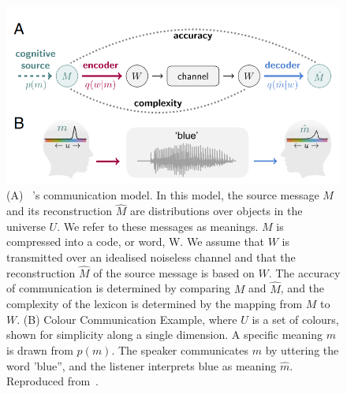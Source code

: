 \begin{figure}[hbt!]
 \centering
 \includegraphics[width=1\textwidth]{image/lit/datacompress1.PNG}
 \caption[(A) Shannon's communication model. In this model, the source
 message $M$ and its reconstruction $\hat{M}$ are distributions over objects
 in the universe $U$. We refer to these messages as meanings. $M$ is compressed
 into a code, or word, W. We assume that $W$ is transmitted over an
 idealised noiseless channel and that the reconstruction $\hat{M}$
 of the source message is based on $W$.
 The accuracy of communication is determined by comparing $M$ and $\hat{M}$,
 and the complexity of the lexicon is determined by the mapping from $M$ to
 $W$. (B) Colour Communication Example, where $U$ is a set of colours, shown
 for simplicity along a single dimension. A specific meaning $m$ is drawn from
 $p(m)$. The speaker communicates $m$ by uttering the word “blue”, and the
 listener interprets blue as meaning $\hat{m}$] 
 {(A)
 ~'s communication model. In this model, the
 source message $M$ and its reconstruction $\hat{M}$ are distributions over
 objects in the universe $U$. We refer to these messages as meanings. $M$ is
 compressed into a code, or word, W. We assume that $W$ is transmitted over an
 idealised noiseless channel and that the reconstruction $\hat{M}$ of the
 source message is based on $W$. The accuracy of communication is determined by
 comparing $M$ and $\hat{M}$, and the complexity of the lexicon is determined
 by the mapping from $M$ to $W$. (B) Colour Communication Example, where $U$
 is a set of colours, shown for simplicity along a single dimension. A specific
 meaning $m$ is drawn from $p(m)$. The speaker communicates $m$ by uttering the
 word 'blue”, and the listener interprets blue as meaning $\hat{m}$.
 Reproduced from~.}
 \label{fig:datacompression1}
\end{figure}

